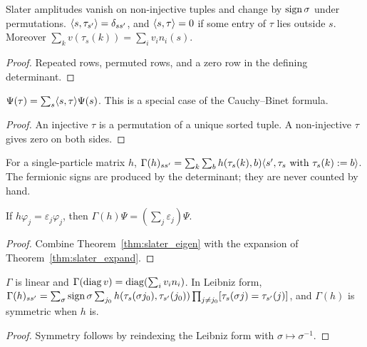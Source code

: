 \begin{lemma}
  \label{lem:amp_props}
  \leanok
  Slater amplitudes vanish on non-injective tuples and change by $\operatorname{sign}\sigma$ under permutations.
  $\langle s, \tau_{s'}\rangle=\delta_{ss'}$, and $\langle s, \tau\rangle=0$ if some entry of $\tau$ lies outside $s$.
  Moreover $\sum_kv(\tau_s(k))=\sum_iv_in_i(s)$.
\end{lemma}
\begin{proof}
  \leanok
  Repeated rows, permuted rows, and a zero row in the defining determinant.
\end{proof}

\begin{theorem}
  \label{thm:slater_expand}
  \leanok
  $\Psi(\tau)=\sum_s\langle s, \tau\rangle\Psi(s)$. This is a special case of the Cauchy--Binet formula.
\end{theorem}
\begin{proof}
  \leanok
  An injective $\tau$ is a permutation of a unique sorted tuple. A non-injective $\tau$ gives zero on both
  sides.
\end{proof}

\begin{definition}
  \label{def:Gamma}
  \leanok
  For a single-particle matrix $h$,
  $\Gamma(h)_{ss'}=\sum_k\sum_bh(\tau_s(k),b)\langle s', \tau_s\text{ with }\tau_s(k):=b\rangle$.
  The fermionic signs are produced by the determinant; they are never counted by hand.
\end{definition}

\begin{theorem}
  \label{thm:gamma_slater}
  \leanok
  If $h\varphi_j=\varepsilon_j\varphi_j$, then $\Gamma(h)\Psi=(\sum_j\varepsilon_j)\Psi$.
\end{theorem}
\begin{proof}
  \leanok
  Combine Theorem~\ref{thm:slater_eigen} with the expansion of Theorem~\ref{thm:slater_expand}.
\end{proof}

\begin{lemma}
  \label{lem:gamma_structure}
  \leanok
  $\Gamma$ is linear and $\Gamma(\operatorname{diag} v)=\operatorname{diag}(\sum_iv_in_i)$. In Leibniz form,
  $\Gamma(h)_{ss'}=\sum_\sigma\operatorname{sign}\sigma\sum_{j_0}h(\tau_s(\sigma j_0),\tau_{s'}(j_0))\prod_{j\ne j_0}[\tau_s(\sigma j)=\tau_{s'}(j)]$,
  and $\Gamma(h)$ is symmetric when $h$ is.
\end{lemma}
\begin{proof}
  \leanok
  Symmetry follows by reindexing the Leibniz form with $\sigma\mapsto\sigma^{-1}$.
\end{proof}

